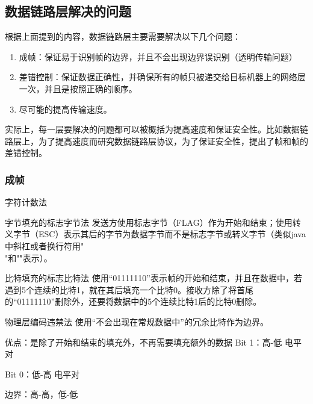     \subsection{数据链路层解决的问题}
    根据上面提到的内容，数据链路层主要需要解决以下几个问题：
    \begin{enumerate}
        \item 成帧：保证易于识别帧的边界，并且不会出现边界误识别（透明传输问题）
        \item 差错控制：保证数据正确性，并确保所有的帧只被递交给目标机器上的网络层一次，并且是按照正确的顺序。
        \item 尽可能的提高传输速度。
    \end{enumerate}

    \begin{quotebox}
        实际上，每一层要解决的问题都可以被概括为提高速度和保证安全性。比如数据链路层上，为了提高速度而研究数据链路层协议，为了保证安全性，提出了帧和帧的差错控制。
    \end{quotebox}

    \subsubsection{成帧}
    \begin{parabox}{字符计数法}
        
    \end{parabox}
    \begin{parabox}{字节填充的标志字节法}
        发送方使用标志字节（FLAG）作为开始和结束；使用转义字节（ESC）表示其后的字节为数据字节而不是标志字节或转义字节（类似java中斜杠或者换行符用"\\"和"\r"表示）。
    \end{parabox}

    \begin{parabox}{比特填充的标志比特法}
        使用“01111110”表示帧的开始和结束，并且在数据中，若遇到5个连续的比特1，就在其后填充一个比特0。接收方除了将首尾的“01111110”删除外，还要将数据中的5个连续比特1后的比特0删除。        
    \end{parabox}

    \begin{parabox}{物理层编码违禁法}
        使用“不会出现在常规数据中”的冗余比特作为边界。
        
        优点：是除了开始和结束的填充外，不再需要填充额外的数据
        \tcblower
        Bit 1：高-低 电平对

        Bit 0：低-高 电平对

        边界：高-高，低-低
    \end{parabox}
